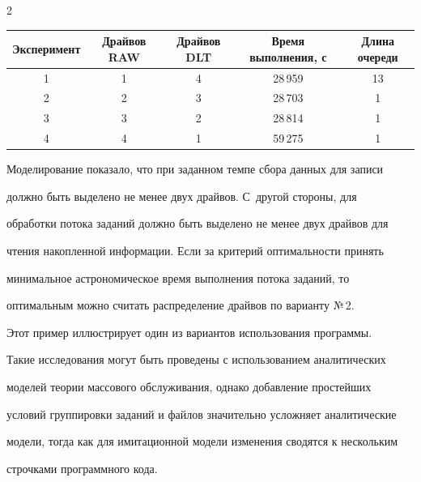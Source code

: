 \begin{multicols}{2}
\begin{table}
\begin{center}
\begin{tabular}{|c|c|c|c|c|}
\hline


Эксперимент&Драйвов RAW&Драйвов DLT&Время выполнения, с&Длина очереди\\


\hline


1&1&4&28\,959&13\hphantom{9}\\


2&2&3&28\,703&1\\


3&3&2&28\,814&1\\


4&4&1&59\,275&1\\


\hline


\end{tabular}


\end{center}


\vspace*{-6pt}


\end{table}


   


   Моделирование показало, что при заданном темпе сбора данных для записи 


должно быть выделено не менее двух драйвов. С~другой стороны, для 


обработки потока заданий должно быть выделено не менее двух драйвов для 


чтения накопленной информации. Если за критерий оп\-ти\-маль\-ности принять 


минимальное астрономическое время выполнения потока заданий, то 


оптимальным можно считать распределение драйвов по варианту №\,2.


   


   Этот пример иллюстрирует один из вариантов использования программы. 


Такие исследования могут быть проведены с использованием аналитических 


моделей теории массового обслуживания, однако добавление простейших 


условий группировки заданий и файлов значительно усложняет аналитические 


модели, тогда как для имитационной модели изменения сводятся к нескольким 


строчками программного кода. 






\end{multicols}
